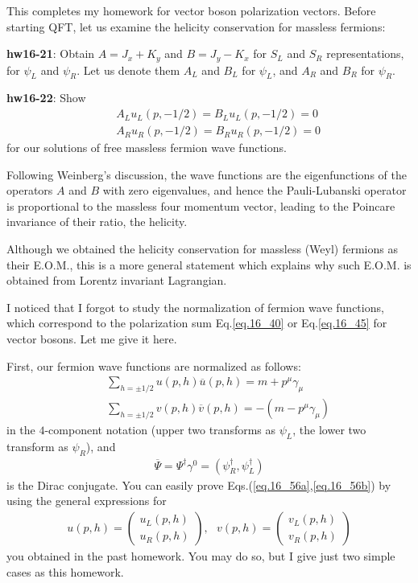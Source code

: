 \documentclass[12pt]{article}
\begin{document}
This completes my homework for vector boson polarization vectors.
Before starting QFT, let us examine the helicity conservation for
massless fermions:

{\bf hw16-21}: Obtain $A = J_x + K_y$ and $B = J_y - K_x$ for $S_L$ and $S_R$
representations, for $\psi_L$ and $\psi_R$. Let us denote them
$A_L$ and $B_L$ for $\psi_L$, and $A_R$ and $B_R$ for $\psi_R$.

{\bf hw16-22}: Show
\begin{eqnarray}
  && A_L u_L(p,-1/2) = B_L u_L(p,-1/2) = 0 \label{eq.16_55a} \\
  && A_R u_R(p,-1/2) = B_R u_R(p,-1/2) = 0 \label{eq.16_55b}
\end{eqnarray}
for our solutions of free massless fermion wave functions.

Following Weinberg's discussion, the wave functions are the
eigenfunctions of the operators $A$ and $B$ with zero eigenvalues,
and hence the Pauli-Lubanski operator is proportional to the
massless four momentum vector, leading to the Poincare invariance
of their ratio, the helicity.

Although we obtained the helicity conservation for massless (Weyl)
fermions as their E.O.M., this is a more general statement which
explains why such E.O.M. is obtained from Lorentz invariant Lagrangian.

I noticed that I forgot to study the normalization of fermion wave
functions, which correspond to the polarization sum Eq.\ref{eq.16_40} or Eq.\ref{eq.16_45} for vector bosons. Let me give it here.

First, our fermion wave functions are normalized as follows:
\begin{eqnarray}
  &&\sum_{h=\pm1/2} u(p,h) {\overline u}(p,h)
    = m + p^\mu \gamma_\mu \label{eq.16_56a}\\
  &&\sum_{h=\pm1/2} v(p,h) {\overline v}(p,h)
    = -(m - p^\mu \gamma_\mu) \label{eq.16_56b}
\end{eqnarray}
in the $4$-component notation (upper two transforms as $\psi_L$,
the lower two transform as $\psi_R$), and
\begin{eqnarray}
  {\overline \Psi} = \Psi^\dagger \gamma^0
             = (\psi_R^\dagger, \psi_L^\dagger) \label{eq.16_57}
\end{eqnarray}
is the Dirac conjugate. You can easily prove Eqs.(\ref{eq.16_56a},\ref{eq.16_56b}) by using
the general expressions for
\begin{eqnarray}
  u(p,h) =  
  \begin{pmatrix}
    u_L(p,h) \\ u_R(p,h)
  \end{pmatrix},~~~
  v(p,h) = 
  \begin{pmatrix}
    v_L(p,h) \\ v_R(p,h)
  \end{pmatrix} \label{eq.16_58}
\end{eqnarray}
you obtained in the past homework. You may do so, but I give
just two simple cases as this homework.
\end{document}
